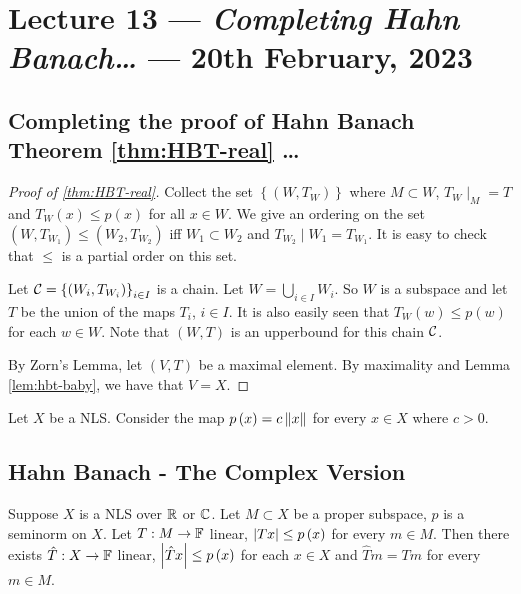 \section{Lecture 13 --- \emph{Completing Hahn Banach\ldots} --- 20th February, 2023}
\horz
\subsection{Completing the proof of Hahn Banach Theorem \ref{thm:HBT-real} \ldots}
\begin{proof}[Proof of \ref{thm:HBT-real}]
Collect the set $\left\{ \left( W, T_{W} \right) \right\}$ where $M \subset W$, $T_{W} \mid _{M} = T$ and $T_{W}(x) \le p(x)$ for all $x\in W$. We give an ordering on the set $\left( W, T_{W_{1}} \right) \le \left( W_{2} , T_{W_{2}} \right)$ iff $W_{1} \subset W_{2}$ and $T_{W_{2}} \mid W_{1} = T_{W_{1}}$. It is easy to check that $\le$ is a partial order on this set.

Let ${\cal C} = \left\{ \left( W_{i}, T_{W_{i}} \right) \right\}_{i\in I}$ is a chain. Let $W= \bigcup_{i \in I} W_{i}$. So $W$ is a subspace and let $T$ be the union of the maps $T_{i}$, $i\in I$. It is also easily seen that $T_{W} \left( w \right) \le p \left( w \right)$ for each $w \in W$. Note that $\left( W, T \right)$ is an upperbound for this chain ${\cal C}$. 

By Zorn's Lemma, let $\left( V, T \right)$ be a maximal element. By maximality and Lemma \ref{lem:hbt-baby}, we have that $V=X$.
\end{proof}

\begin{example}[Seminorm]
    Let $X$ be a NLS. Consider the map $p\left( x \right) = c \left\lVert x \right\rVert$ for every $x \in X$ where $c > 0$.
\end{example}
\subsection{Hahn Banach - The Complex Version}
\begin{theorem}
    Suppose $X$ is a NLS over $\mathbb R$ or $\mathbb C$. Let $M \subset X$ be a proper subspace, $p$ is a seminorm on $X$. Let $T: M \to \mathbb F$ linear, $\left\lvert Tx \right\rvert \le p\left( x \right)$ for every $m\in M$. Then there exists $\hat{T} : X \to \mathbb F$ linear, $\left\lvert \hat{T}x \right\rvert \le p\left( x \right)$ for each $x\in X$ and $\hat{T} m = Tm$ for every $m \in M$.
    \label{thm:actual-hahn-banach}
\end{theorem}


